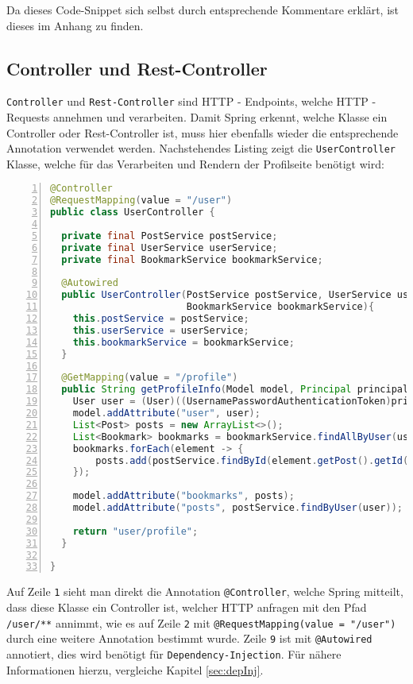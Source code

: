 \documentclass[paper=a4,12pt]{scrreprt}
\begin{document}
Da dieses Code-Snippet sich selbst durch entsprechende Kommentare erklärt, ist dieses im Anhang zu finden.\newline

\subsection{Controller und Rest-Controller}
\label{sec:controller}

\texttt{Controller} und \texttt{Rest-Controller}\cite{rest} sind HTTP - Endpoints, welche HTTP - Requests annehmen und verarbeiten. Damit Spring erkennt, welche Klasse
ein Controller oder Rest-Controller ist, muss hier ebenfalls wieder die entsprechende Annotation verwendet werden.\newline
Nachstehendes Listing zeigt die \texttt{UserController} Klasse, welche für das Verarbeiten und Rendern der Profilseite benötigt wird:\newline


\begin{lstlisting}[caption={User-Controller}, captionpos=b, label={listing:user_controller}, language=java, numbers=left,
  stepnumber=1]
@Controller
@RequestMapping(value = "/user")
public class UserController {

  private final PostService postService;
  private final UserService userService;
  private final BookmarkService bookmarkService;

  @Autowired
  public UserController(PostService postService, UserService userService, 
                        BookmarkService bookmarkService){
    this.postService = postService;
    this.userService = userService;
    this.bookmarkService = bookmarkService;
  }

  @GetMapping(value = "/profile")
  public String getProfileInfo(Model model, Principal principal){
    User user = (User)((UsernamePasswordAuthenticationToken)principal).getPrincipal();
    model.addAttribute("user", user);
    List<Post> posts = new ArrayList<>();
    List<Bookmark> bookmarks = bookmarkService.findAllByUser(user);
    bookmarks.forEach(element -> {
        posts.add(postService.findById(element.getPost().getId()));
    });

    model.addAttribute("bookmarks", posts);
    model.addAttribute("posts", postService.findByUser(user));

    return "user/profile";
  }

}
\end{lstlisting}

Auf Zeile \texttt{1} sieht man direkt die Annotation \texttt{@Controller}, welche Spring mitteilt, dass diese Klasse ein Controller ist, welcher HTTP anfragen mit den Pfad \texttt{/user/**} annimmt, wie
es auf Zeile \texttt{2} mit \texttt{@RequestMapping(value = "/user")} durch eine weitere Annotation bestimmt wurde.\newline
Zeile \texttt{9} ist mit \texttt{@Autowired} annotiert, dies wird benötigt für \texttt{Dependency-Injection}. Für nähere Informationen hierzu, vergleiche Kapitel \ref{sec:depInj}.\newline
\end{document}
